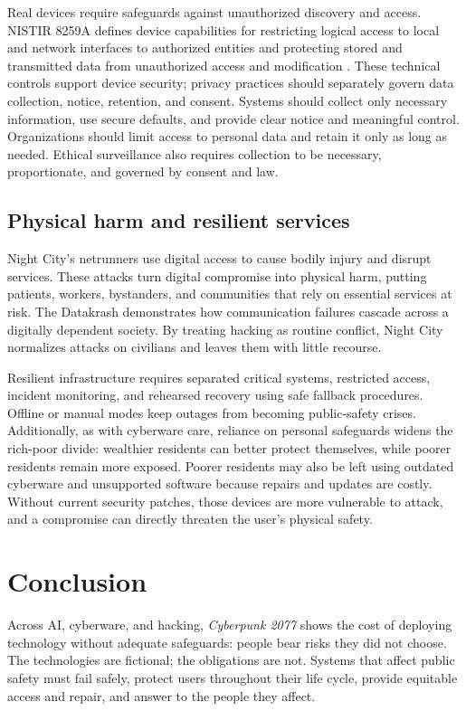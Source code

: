 \documentclass{article}%
\begin{document}
Real devices require safeguards against unauthorized discovery and access. NISTIR 8259A defines device capabilities for restricting logical access to local and network interfaces to authorized entities and protecting stored and transmitted data from unauthorized access and modification \cite{NIST2020}. These technical controls support device security; privacy practices should separately govern data collection, notice, retention, and consent. Systems should collect only necessary information, use secure defaults, and provide clear notice and meaningful control. Organizations should limit access to personal data and retain it only as long as needed. Ethical surveillance also requires collection to be necessary, proportionate, and governed by consent and law.

\subsection{Physical harm and resilient services}
Night City's netrunners use digital access to cause bodily injury and disrupt services. These attacks turn digital compromise into physical harm, putting patients, workers, bystanders, and communities that rely on essential services at risk. The Datakrash demonstrates how communication failures cascade across a digitally dependent society. By treating hacking as routine conflict, Night City normalizes attacks on civilians and leaves them with little recourse.

Resilient infrastructure requires separated critical systems, restricted access, incident monitoring, and rehearsed recovery using safe fallback procedures. Offline or manual modes keep outages from becoming public-safety crises. Additionally, as with cyberware care, reliance on personal safeguards widens the rich-poor divide: wealthier residents can better protect themselves, while poorer residents remain more exposed. Poorer residents may also be left using outdated cyberware and unsupported software because repairs and updates are costly. Without current security patches, those devices are more vulnerable to attack, and a compromise can directly threaten the user's physical safety.

\section{Conclusion}
Across AI, cyberware, and hacking, \textit{Cyberpunk 2077} shows the cost of deploying technology without adequate safeguards: people bear risks they did not choose. The technologies are fictional; the obligations are not. Systems that affect public safety must fail safely, protect users throughout their life cycle, provide equitable access and repair, and answer to the people they affect.



\end{document}
